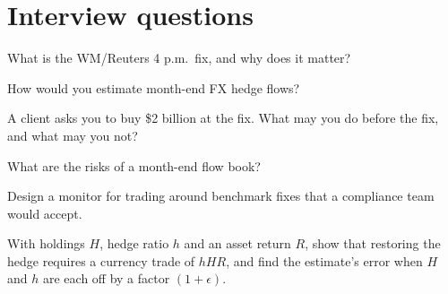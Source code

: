 \section{Interview questions}

\begin{interviewq}\label{iq:s2:fx-flow-strategies:1}
What is the WM/Reuters 4 p.m.\ fix, and why does it matter?
\end{interviewq}

\begin{interviewq}\label{iq:s2:fx-flow-strategies:2}
How would you estimate month-end FX hedge flows?
\end{interviewq}

\begin{interviewq}\label{iq:s2:fx-flow-strategies:3}
A client asks you to buy \$2 billion at the fix. What may you do before the fix, and what may you not?
\end{interviewq}

\begin{interviewq}\label{iq:s2:fx-flow-strategies:4}
What are the risks of a month-end flow book?
\end{interviewq}

\begin{interviewq}\label{iq:s2:fx-flow-strategies:5}
Design a monitor for trading around benchmark fixes that a compliance team would accept.
\end{interviewq}

\begin{interviewq}\label{iq:s2:fx-flow-strategies:6}
With holdings $H$, hedge ratio $h$ and an asset return $R$, show that restoring the hedge requires a currency trade of $hHR$, and find the estimate's
error when $H$ and $h$ are each off by a factor $(1 + \epsilon)$.
\end{interviewq}
